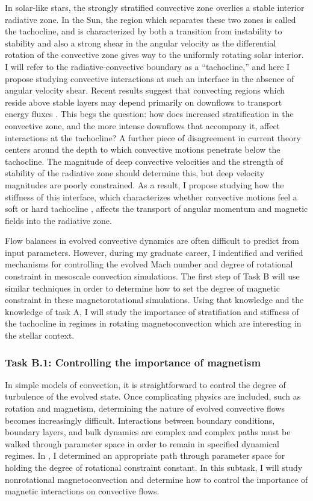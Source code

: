\documentclass[aasms,11pt, longbibliography]{article}
\begin{document}
In solar-like stars, the strongly stratified convective zone overlies a stable interior radiative zone.
In the Sun, the region which separates these two zones is called the tachocline, and is characterized by both a transition from instability to stability and also a strong shear in the angular velocity as the differential rotation of the convective zone gives way to the uniformly rotating solar interior.
I will refer to the radiative-convective boundary as a ``tachocline,'' and here I propose studying convective interactions at such an interface in the absence of angular velocity shear. 
Recent results suggest that convecting regions which reside above stable layers may depend primarily on downflows to transport energy fluxes \citep{kapyla&all2017}.
This begs the question: how does increased stratification in the convective zone, and the more intense downflows that accompany it, affect interactions at the tachocline?
A further piece of disagreement in current theory centers around the depth to which convective motions penetrate below the tachocline.
The magnitude of deep convective velocities and the strength of stability of the radiative zone should determine this, but deep velocity magnitudes are poorly constrained.
As a result, I propose studying how the stiffness of this interface, which characterizes whether convective motions feel a soft or hard tachocline \citep{couston&all2017}, affects the transport of angular momentum and magnetic fields into the radiative zone.

Flow balances in evolved convective dynamics are often difficult to predict from input parameters.
However, during my graduate career, I indentified and verified mechanisms for controlling the evolved Mach number \citep{anders&brown2017} and degree of rotational constraint \citep[][and Fig. \ref{fig:rossby_plot}]{anders&all2019} in mesoscale convection simulations.
The first step of Task B will use similar techniques in order to determine how to set the degree of magnetic constraint in these magnetorotational simulations.
Using that knowledge and the knowledge of task A, I will study the importance of stratifiation and stiffness of the tachocline in regimes in rotating magnetoconvection which are interesting in the stellar context.

\subsubsection{Task B.1: Controlling the importance of magnetism}
\label{sct:taskB1}
In simple models of convection, it is straightforward to control the degree of turbulence of the evolved state.
Once complicating physics are included, such as rotation and magnetism, determining the nature of evolved convective flows becomes increasingly difficult.
Interactions between boundary conditions, boundary layers, and bulk dynamics are complex and complex paths must be walked through parameter space in order to remain in specified dynamical regimes.
In \citet{anders&all2019}, I determined an appropriate path through parameter space for holding the degree of rotational constraint constant.
In this subtask, I will study nonrotational magnetoconvection and determine how to control the importance of magnetic interactions on convective flows.
\end{document}
